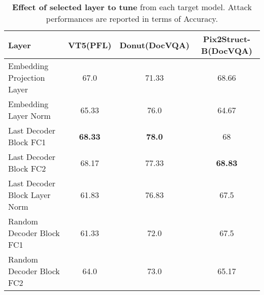 \begin{table}[t]
\begin{center}
\begin{small}
\small
\begin{tabular}{lccc}
\toprule
Layer & VT5(PFL) & Donut(DocVQA) & Pix2Struct-B(DocVQA)\\
\midrule 
Embedding Projection Layer & 67.0 & 71.33 & 68.66\\
Embedding Layer Norm & 65.33 & 76.0 & 64.67\\
\cmidrule{1-4}
Last Decoder Block FC1 & \textbf{68.33} & \textbf{78.0} & 68\\
Last Decoder Block FC2 & 68.17 & 77.33 & \textbf{68.83}\\
Last Decoder Block Layer Norm & 61.83 & 76.83 & 67.5\\
\cmidrule{1-4}
Random Decoder Block FC1 & 61.33 & 72.0 & 67.5\\
Random Decoder Block FC2 & 64.0 & 73.0 & 65.17\\
\bottomrule
\end{tabular}
\end{small}
\end{center}
\caption{\textbf{Effect of selected layer to tune} from each target model. Attack performances are reported in terms of Accuracy.}
\label{tab:ablate_layer}
\vspace{-0.2in}
\end{table}

